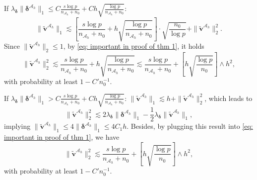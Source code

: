 \documentclass[12pt]{article}
\newcommand{\bdelta}{\bm{\delta}}
\newcommand{\bdeltaah}{\bm{\delta}^{\mathcal{A}_h}}
\newcommand{\twonorm}[1]{\|#1\|_{2}}
\newcommand{\onenorm}[1]{\|#1\|_{1}}
\newcommand{\bv}{\bm{v}}
\newcommand{\mah}{\mathcal{A}_h}
\newcommand{\nah}{n_{\mathcal{A}_h}}
\newcommand{\<}{\langle}
\renewcommand{\>}{\rangle}
\begin{document}
		If $\lambda_{\bdelta}\onenorm{\bdeltaah} \leq C\frac{s\log p}{\nah+n_0} + Ch \sqrt{\frac{\log p}{\nah + n_0}}$:
		\begin{equation}
			\onenorm{\tilde{\bv}^{\mah}} \lesssim \left[\frac{s\log p}{\nah+n_0} + h \sqrt{\frac{\log p}{\nah + n_0}}\right] \cdot \sqrt{\frac{n_0}{\log p}} + \twonorm{\tilde{\bv}^{\mah}}^2.
		\end{equation}
		Since $\twonorm{\tilde{\bv}^{\mah}} \leq 1$, by \eqref{eq: important in proof of thm 1}, it holds 
		\begin{equation}
			\twonorm{\tilde{\bv}^{\mah}}^2 \lesssim \frac{s\log p}{\nah+n_0} + h\sqrt{\frac{\log p}{\nah + n_0}} \lesssim \frac{s\log p}{\nah+n_0} + \left[h\sqrt{\frac{\log p}{n_0}}\right] \wedge h^2,
		\end{equation}
		with probability at least $1-C'n_0^{-1}$.

		If $\lambda_{\bdelta}\onenorm{\bdeltaah} > C\frac{s\log p}{\nah+n_0} + Ch \sqrt{\frac{\log p}{\nah + n_0}}$: $\onenorm{\tilde{\bv}^{\mah}} \lesssim h + \twonorm{\tilde{\bv}^{\mah}}^2$, which leads to
		\begin{equation}
			\twonorm{\tilde{\bv}^{\mah}}^2 \lesssim 2\lambda_{\bdelta}\onenorm{\bdeltaah} - \frac{1}{2}\lambda_{\bdelta}\onenorm{\tilde{\bv}^{\mah}},
		\end{equation}
		implying $\onenorm{\tilde{\bv}^{\mah}} \leq 4\onenorm{\bdeltaah} \leq 4C_1h$. Besides, by plugging this result into \eqref{eq: important in proof of thm 1}, we have
		\begin{equation}
			\twonorm{\tilde{\bv}^{\mah}}^2 \lesssim \frac{s\log p}{\nah+n_0} + \left[h\sqrt{\frac{\log p}{n_0}}\right] \wedge h^2, \label{eq: va bound final}
		\end{equation}
		with probability at least $1-C'n_0^{-1}$.
		
\end{document}
